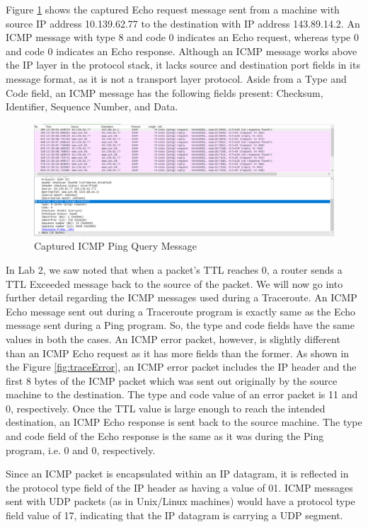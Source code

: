 \documentclass[10pt]{IEEEtran}
\begin{document}
 Figure \ref{fig:pingRequest} shows the captured Echo request message sent from a machine with source IP address 10.139.62.77 to the destination with IP address 143.89.14.2. An ICMP message with type 8 and code 0 indicates an Echo request, whereas type 0 and code 0 indicates an Echo response. Although an ICMP message works above the IP layer in the protocol stack, it lacks source and destination port fields in its message format, as it is not a transport layer protocol. Aside from a Type and Code field, an ICMP message has the following fields present: Checksum, Identifier, Sequence Number, and Data. \\

\begin{figure}[h!]
	\includegraphics[width=\linewidth]{Echo_request.png}
	\caption{Captured ICMP Ping Query Message}
	\label{fig:pingRequest}
\end{figure}

 In Lab 2, we saw noted that when a packet's TTL reaches 0, a router sends a TTL Exceeded message back to the source of the packet. We will now go into further detail regarding the ICMP messages used during a Traceroute. An ICMP Echo message sent out during a Traceroute program is exactly same as the Echo message sent during a Ping program. So, the type and code fields have the same values in both the cases. An ICMP error packet, however, is slightly different than an ICMP Echo request as it has more fields than the former. As shown in the Figure \ref{fig:traceError}, an ICMP error packet includes the IP header and the first 8 bytes of the ICMP packet which was sent out originally by the source machine to the destination. The type and code value of an error packet is 11 and 0, respectively. Once the TTL value is large enough to reach the intended destination, an ICMP Echo response is sent back to the source machine. The type and code field of the Echo response is the same as it was during the Ping program, i.e. 0 and 0, respectively.
 
 Since an ICMP packet is encapsulated within an IP datagram, it is reflected in the protocol type field of the IP header as having a value of 01. ICMP messages sent with UDP packets (as in Unix/Linux machines) would have a protocol type field value of 17, indicating that the IP datagram is carrying a UDP segment.\\
\end{document}
